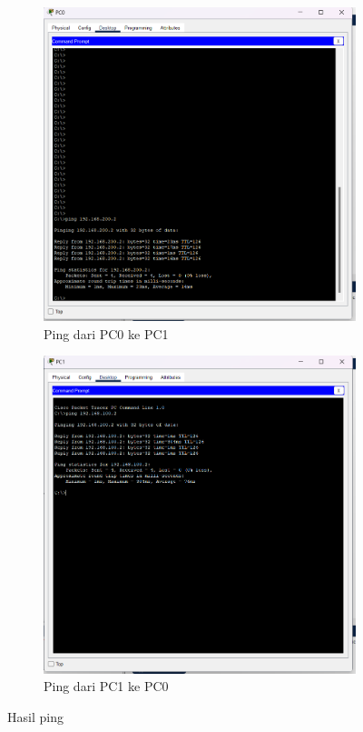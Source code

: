 \begin{figure}[H]
	\centering
	\begin{subfigure}[b]{0.4\linewidth}
		\centering
		\includegraphics[width=\linewidth]{P5/img/tumod (2).png}
		\caption{Ping dari PC0 ke PC1\label{fig:konfigurasiR1}}
	\end{subfigure}
	\begin{subfigure}[b]{0.4\linewidth}
		\centering
		\includegraphics[width=\linewidth]{P5/img/tumod (3).png}
		\caption{Ping dari PC1 ke PC0\label{fig:konfigurasiR2}}
	\end{subfigure}
	\caption{Hasil ping}
	\hspace{1cm}
\end{figure}
